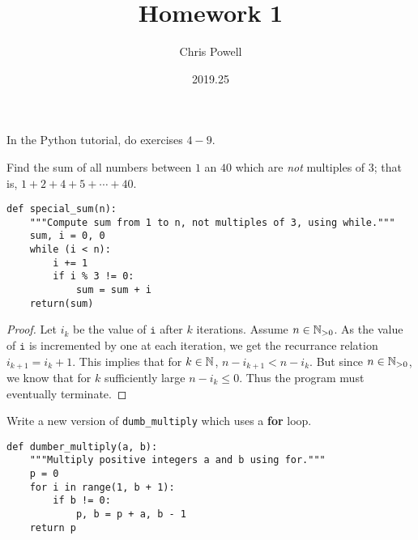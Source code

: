 \documentclass[10pt,twoside]{amsart}
\begin{document}
\title{Homework 1}
\author{Chris Powell}
\date{2019.25}
\maketitle
\thispagestyle{firststyle}

\begin{exercises}
    \item In the Python tutorial, do exercises $4-9$.
        
        \setcounter{exercise}{3}
        \begin{exercise} 
             Find the sum of all numbers between $1$ an $40$ which are \emph{not} multiples of $3$; that is, $1 + 2 + 4 + 5 + \cdots + 40$.   
        \end{exercise}

    \begin{minipage}{\textwidth}
    \begin{lstlisting}
def special_sum(n):
    """Compute sum from 1 to n, not multiples of 3, using while."""
    sum, i = 0, 0
    while (i < n):
        i += 1
        if i % 3 != 0:
            sum = sum + i
    return(sum)
        \end{lstlisting}
    \end{minipage}
            
            \begin{proof} Let $i_k$ be the value of $\texttt{i}$ after $k$ iterations. Assume $n \in \mathbb{N}_{>0}$. As the value of $\texttt{i}$ is incremented by one at each iteration, we get the recurrance relation $i_{k+1} = i_k+1$. This implies that for $k \in \mathbb{N}$, $n-i_{k+1} < n - i_k$. But since $n \in \mathbb{N}_{>0}$, we know that for $k$ sufficiently large $n-i_k \leq 0$. Thus the program must eventually terminate. 
            \end{proof}


        \begin{exercise}Write a new version of \texttt{dumb\_multiply} which uses a \textbf{for} loop.
        \end{exercise}


    \begin{minipage}{\textwidth}
        \begin{lstlisting}
def dumber_multiply(a, b):
    """Multiply positive integers a and b using for."""
    p = 0
    for i in range(1, b + 1):
        if b != 0:
            p, b = p + a, b - 1
    return p
        \end{lstlisting}
    \end{minipage}




\end{exercises}
\end{document}
